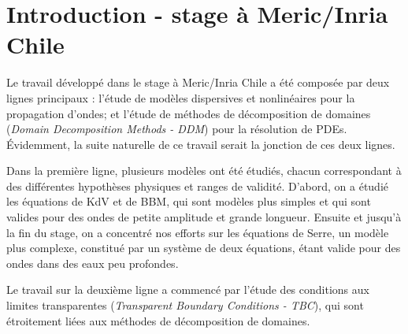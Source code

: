 \section{Introduction - stage à Meric/Inria Chile}

\indent Le travail développé dans le stage à Meric/Inria Chile a été composée par deux lignes principaux : l'étude de modèles dispersives et nonlinéaires pour la propagation d'ondes; et l'étude de méthodes de décomposition de domaines (\emph{Domain Decomposition Methods - DDM}) pour la résolution de PDEs. Évidemment, la suite naturelle de ce travail serait la jonction de ces deux lignes.

\indent Dans la première ligne, plusieurs modèles ont été étudiés, chacun correspondant à des différentes hypothèses physiques et ranges de validité. D'abord, on a étudié les équations de KdV et de BBM, qui sont modèles plus simples et qui sont valides pour des ondes de petite amplitude et grande longueur. Ensuite et jusqu'à la fin du stage, on a concentré nos efforts sur les équations de Serre, un modèle plus complexe, constitué par un système de deux équations, étant valide pour des ondes dans des eaux peu profondes.

\indent Le travail sur la deuxième ligne a commencé par l'étude des conditions aux limites transparentes (\emph{Transparent Boundary Conditions - TBC}), qui sont étroitement liées aux méthodes de décomposition de domaines. 

 